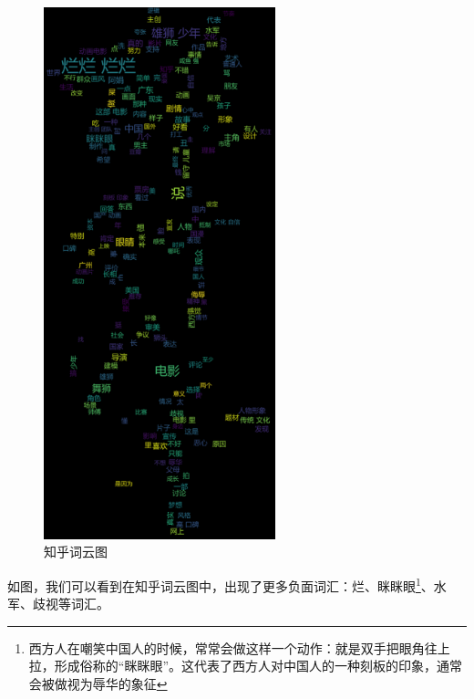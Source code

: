 \documentclass[12pt,a4paper,utf8]{article}
\begin{document}
\begin{figure}[H]
{\begin{minipage}[b]{.45\textwidth}
     \end{minipage}
}
\subfigure 
{  
    \begin{minipage}[b]{.45\textwidth}
        \centering
        \caption{知乎词云图}
        \includegraphics[width=0.6\textwidth]{images/zhihu.png}
    \end{minipage}
     
} 
\end{figure} 
如图，我们可以看到在知乎词云图中，出现了更多负面词汇：烂、眯眯眼\footnote{西方人在嘲笑中国人的时候，常常会做这样一个动作：就是双手把眼角往上拉，形成俗称的“眯眯眼”。这代表了西方人对中国人的一种刻板的印象，通常会被做视为辱华的象征}、水军、歧视等词汇。
\end{document}
